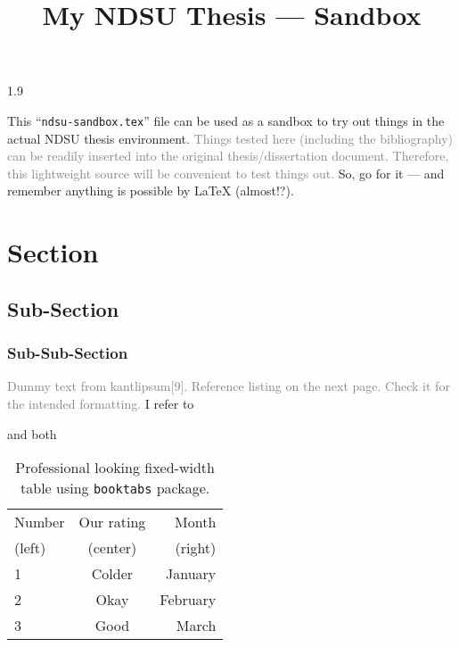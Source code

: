 \documentclass[12pt,mathdesign]{ndsu-thesis-2022}
\title{My NDSU Thesis --- Sandbox}
\newcommand\myspacing{1.9}%
\begin{document}
\begin{spacing}{\myspacing}      %


This ``\texttt{ndsu-sandbox.tex}'' file can be used as a sandbox to try out things in the actual NDSU thesis environment. \textcolor{gray}{Things tested here (including the bibliography) can be readily inserted into the original thesis/dissertation document. Therefore, this lightweight source will be convenient to test things out.} So, go for it --- and remember anything is possible by \LaTeX{} (almost!?).

\section{Section}
\subsection{Sub-Section}
\subsubsection{Sub-Sub-Section}

\textcolor{gray}{Dummy text from kantlipsum[9]. Reference listing on the next page. Check it for the intended formatting.} I refer to %


\citealp{chen2023air} and both \citep{ch2021effects,chen2023air}
\citeauthor*{chen2023air}

\textcite{chen2023air}

\cite{chen2023air}

\begin{table}[ht]
\centering
\caption{Professional looking fixed-width table using 
\texttt{booktabs} package.}
\begin{tabular}{ l c r }
\toprule
Number & Our rating & Month \\
(left) & (center)   & (right)\\
\midrule
1 & Colder & January \\
2 & Okay   & February \\
3 & Good   & March\\
\bottomrule
\end{tabular}
\label{tab22}
\end{table}


\end{spacing}
\end{document}
